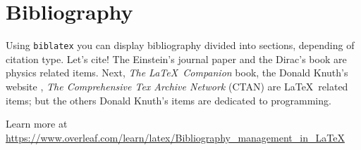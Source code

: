 \section{Bibliography}

Using \texttt{biblatex} you can display bibliography divided into sections, depending of citation type.
Let's cite! The Einstein's journal paper \cite{einstein} and the Dirac's book \cite{dirac} are physics related items.
Next, \textit{The \LaTeX\ Companion} book, the Donald Knuth's website \cite{knuthwebsite}, \textit{The Comprehensive Tex Archive Network} (CTAN) are \LaTeX\ related items; but the others Donald Knuth's items \cite{knuth-fa} are dedicated to programming.

Learn more at \url{https://www.overleaf.com/learn/latex/Bibliography_management_in_LaTeX}
